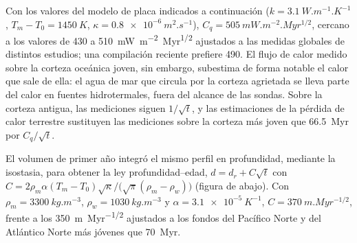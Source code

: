 Con los valores del modelo de placa indicados a continuación ($k = \qty{3.1}{W.m^{-1}.K^{-1}}$,
$T_m - T_0 = \qty{1450}{K}$, $\kappa = \qty{0.8e-6}{m^2.s^{-1}}$), $C_q =
\qty{505}{mW.m^{-2}.Myr^{1/2}}$, cercano a los valores de 430 a
\qty{510}{mW.m^{-2}.Myr^{1/2}} ajustados a las medidas globales de distintos
estudios; una compilación reciente prefiere \num{490}. El flujo de calor medido sobre la
corteza oceánica joven, sin embargo, subestima de forma notable el calor que sale de ella:
el agua de mar que circula por la corteza agrietada se lleva parte del calor
en fuentes hidrotermales, fuera del alcance de las sondas. Sobre la corteza antigua, las mediciones
siguen $1/\sqrt t$, y las estimaciones de la pérdida de calor terrestre sustituyen las
mediciones sobre la corteza más joven que \qty{66.5}{Myr} por $C_q/\sqrt t$.

El volumen de primer año integró el mismo perfil en profundidad, mediante la isostasia, para
obtener la ley profundidad--edad, $d = d_r + C\sqrt t$ con $C = 2\rho_m\alpha(T_m -
T_0)\sqrt\kappa/\bigl(\sqrt\pi(\rho_m - \rho_w)\bigr)$ (figura de abajo). Con
$\rho_m = \qty{3300}{kg.m^{-3}}$, $\rho_w = \qty{1030}{kg.m^{-3}}$ y $\alpha =
\qty{3.1e-5}{K^{-1}}$, $C = \qty{370}{m.Myr^{-1/2}}$, frente a los
\qty{350}{m.Myr^{-1/2}} ajustados a los fondos del Pacífico Norte y del Atlántico Norte
más jóvenes que \qty{70}{Myr}.

